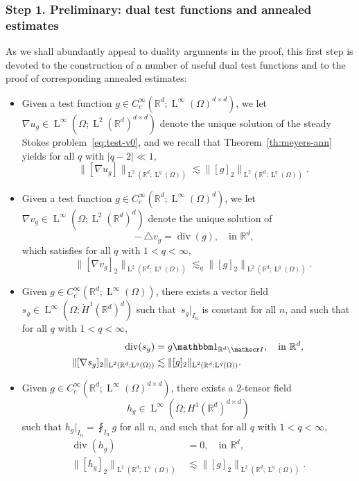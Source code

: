 \documentclass[JEP,XML,SOM,Unicode,published]{cedram}
\let\mathcal\mathscr
\let\mathds\mathbbm
\theoremstyle{plain}
\theoremstyle{definition}
\newcommand{\R}{\mathbb R}
\newcommand{\Ic}{\mathcal I}
\newcommand{\Ld}{\operatorname{L}}
\newcommand{\Div}{{\operatorname{div}}}
\newcommand{\step}[1]{\subsubsection*{Step #1}}
\begin{document}
\step{1. Preliminary: dual test functions and annealed estimates}
As we shall abundantly appeal to duality arguments in the proof, this first step is devoted to the construction of a number of useful dual test functions and to the proof of corresponding annealed estimates:
\begin{itemize}
\item Given a test function $g\in C^\infty_c(\R^d;\Ld^\infty(\Omega)^{d\times d})$, we let $\nabla u_g\in \Ld^\infty(\Omega;\Ld^2(\R^d)^{d\times d})$ denote the unique solution of the steady Stokes problem~\eqref{eq:test-v0}, and we recall that
Theorem~\ref{th:meyers-ann} yields for all $q$ with $|q-2|\ll1$,
\begin{equation}\label{eq:test-V+}
\quad\|[\nabla u_g]\|_{\Ld^2(\R^d;\Ld^q(\Omega))}\lesssim \|[g]_2\|_{\Ld^2(\R^d;\Ld^q(\Omega))}.
\end{equation}
\item Given a test function $g\in C^\infty_c(\R^d;\Ld^\infty(\Omega)^{d})$, we let $\nabla v_g\in \Ld^\infty(\Omega;\Ld^2(\R^d)^{d})$ denote the unique solution of
\begin{equation}\label{eq:test-W}
\quad-\triangle v_g=\Div (g),\quad\text{in $\R^d$},
\end{equation}
which satisfies for all $q$ with $1<q<\infty$,
\begin{equation}\label{eq:test-W+}
\quad\|[\nabla v_g]_2\|_{\Ld^2(\R^d;\Ld^q(\Omega))}\lesssim_q \|[g]_2\|_{\Ld^2(\R^d;\Ld^q(\Omega))}.
\end{equation}
\item Given $g\in C^\infty_c(\R^d;\Ld^\infty(\Omega))$, there exists a vector field $s_g\in\Ld^\infty(\Omega;\dot H^1(\R^d)^d)$ such that~$s_g|_{I_n}$ is constant for all $n$, and such that for all $q$ with $1<q<\infty$,
\begin{equation}\label{eq:test-R}
\begin{aligned}
\quad\Div (s_g)&= g\mathds1_{\R^d\setminus\Ic},\quad\text{in $\R^d$},\\
\|[\nabla s_g]_2\|_{\Ld^2(\R^d;\Ld^q(\Omega))}&\lesssim \|[g]_2\|_{\Ld^2(\R^d;\Ld^q(\Omega))}.
\end{aligned}
\end{equation}
\item Given $g\in C^\infty_c(\R^d;\Ld^\infty(\Omega)^{d\times d})$, there exists a $2$-tensor field
\[
h_g\in\Ld^\infty(\Omega;H^1(\R^d)^{d\times d})
\]
such that $h_g|_{I_n}=\fint_{I_n}g$ for all $n$, and such that for all $q$ with $1<q<\infty$,
\begin{equation}\label{eq:test-H}
\begin{aligned}
\Div (h_g)&=0,\quad\text{in $\R^d$},\\
\|[ h_g]_2\|_{\Ld^2(\R^d;\Ld^q(\Omega))}&\lesssim \|[g]_2\|_{\Ld^2(\R^d;\Ld^q(\Omega))}.
\end{aligned}
\end{equation}
\end{itemize}
\end{document}
